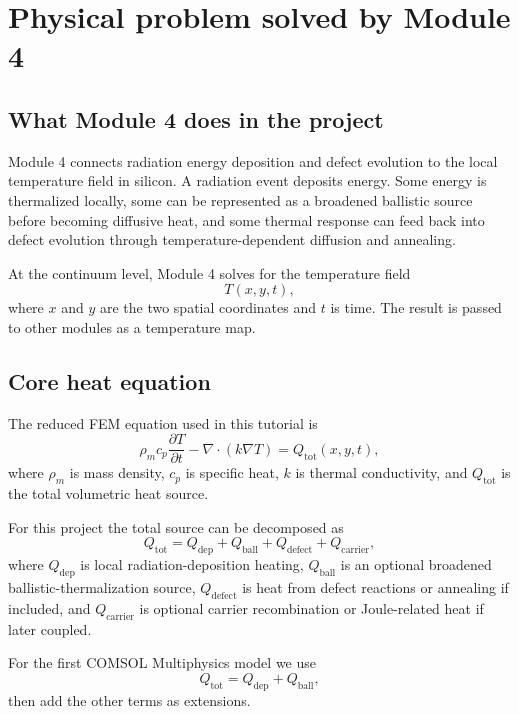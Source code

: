 \documentclass[11pt]{article}
\newcommand{\COMSOL}{COMSOL Multiphysics}
\newcommand{\comsol}{\COMSOL}
\newcommand{\module}{Module 4}
\begin{document}
\section{Physical problem solved by Module 4}

\subsection{What Module 4 does in the project}
\module{} connects radiation energy deposition and defect evolution to the local temperature field in silicon.  A radiation event deposits energy.  Some energy is thermalized locally, some can be represented as a broadened ballistic source before becoming diffusive heat, and some thermal response can feed back into defect evolution through temperature-dependent diffusion and annealing.

At the continuum level, \module{} solves for the temperature field
\begin{equation}
T(x,y,t),
\end{equation}
where \(x\) and \(y\) are the two spatial coordinates and \(t\) is time.  The result is passed to other modules as a temperature map.

\subsection{Core heat equation}
The reduced FEM equation used in this tutorial is
\begin{equation}
\rho_m c_p \frac{\partial T}{\partial t}
-
\nabla\cdot\left(k\nabla T\right)
=
Q_{\mathrm{tot}}(x,y,t),
\label{eq:heat-core}
\end{equation}
where \(\rho_m\) is mass density, \(c_p\) is specific heat, \(k\) is thermal conductivity, and \(Q_{\mathrm{tot}}\) is the total volumetric heat source.

For this project the total source can be decomposed as
\begin{equation}
Q_{\mathrm{tot}}
=
Q_{\mathrm{dep}}
+
Q_{\mathrm{ball}}
+
Q_{\mathrm{defect}}
+
Q_{\mathrm{carrier}},
\label{eq:qtot}
\end{equation}
where \(Q_{\mathrm{dep}}\) is local radiation-deposition heating, \(Q_{\mathrm{ball}}\) is an optional broadened ballistic-thermalization source, \(Q_{\mathrm{defect}}\) is heat from defect reactions or annealing if included, and \(Q_{\mathrm{carrier}}\) is optional carrier recombination or Joule-related heat if later coupled.

For the first \comsol{} model we use
\begin{equation}
Q_{\mathrm{tot}}=Q_{\mathrm{dep}}+Q_{\mathrm{ball}},
\end{equation}
then add the other terms as extensions.
\end{document}

